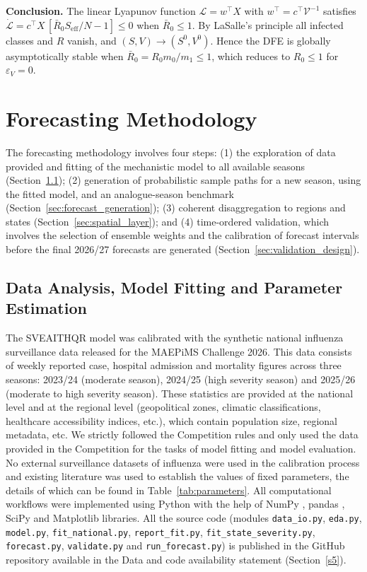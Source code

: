 \documentclass[12pt,a4paper]{article}
\theoremstyle{definition}
\theoremstyle{remark}
\begin{document}
\textbf{Conclusion.} The linear Lyapunov function $\mathcal L=w^\top X$ with
$w^\top=c^\top\mathcal V^{-1}$ satisfies
$\dot{\mathcal L}=c^\top X\,[\bar R_0S_{\mathrm{eff}}/N-1]\le0$ when $\bar R_0\le1$.
By LaSalle's principle all infected classes and $R$ vanish, and
$(S,V)\to(S^0,V^0)$. Hence the DFE is globally asymptotically stable when
$\bar R_0=R_0m_0/m_1\le1$, which reduces to $R_0\le1$ for $\varepsilon_V=0$.




\section{Forecasting Methodology}\label{sec:forecasting_methodology}

The forecasting methodology involves four steps: (1) the exploration of data provided and fitting of the mechanistic model to all available seasons (Section~\ref{sec:data_fitting}); (2) generation of probabilistic sample paths for a new season, using the fitted model, and an analogue-season benchmark (Section~\ref{sec:forecast_generation}); (3) coherent disaggregation to regions and states (Section~\ref{sec:spatial_layer}); and (4) time-ordered validation, which involves the selection of ensemble weights and the calibration of forecast intervals before the final 2026/27 forecasts are generated (Section~\ref{sec:validation_design}).

\subsection{Data Analysis, Model Fitting and Parameter Estimation}\label{sec:data_fitting}

The SVEAITHQR model was calibrated with the synthetic national influenza surveillance data released for the MAEPiMS Challenge 2026. This data consists of weekly reported case, hospital admission and mortality figures across three seasons: 2023/24 (moderate season), 2024/25 (high severity season) and 2025/26 (moderate to high severity season). These statistics are provided at the national level and at the regional level (geopolitical zones, climatic classifications, healthcare accessibility indices, etc.), which contain population size, regional metadata, etc. We strictly followed the Competition rules and only used the data provided in the Competition for the tasks of model fitting and model evaluation. No external surveillance datasets of influenza were used in the calibration process and existing literature was used to establish the values of fixed parameters, the details of which can be found in Table~\ref{tab:parameters}. All computational workflows were implemented using Python with the help of NumPy \cite{harris2020array}, pandas \cite{mckinney2010data}, SciPy \cite{virtanen2020scipy} and Matplotlib \cite{hunter2007matplotlib} libraries. All the source code (modules \texttt{data\_io.py}, \texttt{eda.py}, \texttt{model.py}, \texttt{fit\_national.py}, \texttt{report\_fit.py}, \texttt{fit\_state\_severity.py}, \texttt{forecast.py}, \texttt{validate.py} and \texttt{run\_forecast.py}) is published in the GitHub repository available in the Data and code availability statement (Section~\ref{s5}).
\end{document}
